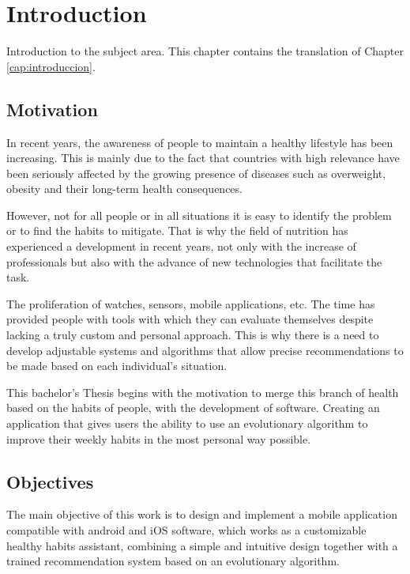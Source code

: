 \chapter*{Introduction}
\label{cap:introduction}

Introduction to the subject area. This chapter contains the translation of Chapter \ref{cap:introduccion}.

\section*{Motivation}
In recent years, the awareness of people to maintain a healthy lifestyle has been increasing. This is mainly due to the fact that countries with high relevance have been seriously affected by the growing presence of diseases such as overweight, obesity and their long-term health consequences. \cite{oms}

However, not for all people or in all situations it is easy to identify the problem or to find the habits to mitigate. That is why the field of nutrition has experienced a development in recent years, not only with the increase of professionals but also with the advance of new technologies that facilitate the task. \cite{scielo}

The proliferation of watches, sensors, mobile applications, etc. The time has provided people with tools with which they can evaluate themselves despite lacking a truly custom and personal approach. This is why there is a need to develop adjustable systems and algorithms that allow precise recommendations to be made based on each individual's situation. 

\cite{Science_direct}

This bachelor's Thesis begins with the motivation to merge this branch of health based on the habits of people, with the development of software. Creating an application that gives users the ability to use an evolutionary algorithm to improve their weekly habits in the most personal way possible.

\section*{Objectives}

The main objective of this work is to design and implement a mobile application compatible with android and iOS software, which works as a customizable healthy habits assistant, combining a simple and intuitive design together with a trained recommendation system based on an evolutionary algorithm.

